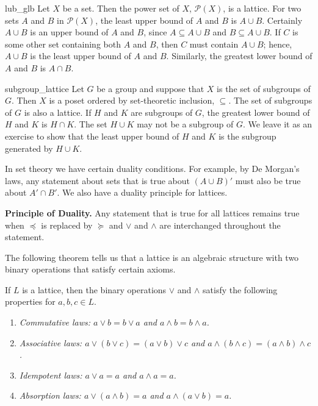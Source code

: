  

\begin{example}{lub_glb}
Let $X$ be a set. Then the power set of $X$, ${\mathcal P}(X)$, is a
lattice. For two sets $A$ and $B$ in ${\mathcal P}(X)$, the least upper
bound of $A$ and $B$ is $A \cup B$. Certainly $A \cup B$ is an upper
bound of $A$ and $B$, since $A \subseteq A \cup B$ and $B \subseteq A
\cup B$.  If $C$ is some other set containing both $A$ and $B$, then
$C$ must contain $A \cup B$; hence, $A \cup B$ is the least upper bound
of $A$ and $B$. Similarly,  the greatest lower bound of $A$ and $B$ is
$A \cap B$.
\end{example}
 
 

\begin{example}{subgroup_lattice}
Let $G$ be a group and suppose that $X$ is the set of subgroups of
$G$.  Then $X$ is a poset ordered by set-theoretic inclusion,
$\subseteq$.  The set of subgroups of $G$ is also a lattice.  If $H$
and $K$ are subgroups of $G$, the greatest lower bound of $H$ and $K$
is $H \cap K$. The set $H \cup K$ may not be a subgroup of $G$.  We
leave it as an exercise to show that the least upper bound of $H$ and
$K$ is the subgroup generated by $H \cup K$. 
\end{example}
 

 
 
In set theory we have certain duality conditions. For example, by De
Morgan's laws, any statement about sets that is true about $(A \cup
B)'$ must also be true about $A' \cap B'$. We also have a duality
principle for lattices. 
 
 
\medskip
 
 
\noindent \textbf{Principle of Duality.}
Any statement that is true for all lattices remains true when
$\preceq$ is replaced by $\succeq$ and $\vee$ and $\wedge$ are
interchanged throughout the statement.
 
 
\medskip
 
 
The following theorem tells us that a lattice is an algebraic
structure with two binary operations that satisfy certain
axioms.						     
 
 
\begin{theorem}
If $L$ is a lattice, then the binary operations $\vee$ and $\wedge$
satisfy the following properties for $a, b, c \in L$.
\begin{enumerate}
 
\rm \item \it
Commutative laws: $a \vee b = b \vee a$ and $a \wedge b = b \wedge a$.
 
\rm \item \it
Associative laws: $a \vee ( b \vee c) = (a \vee b) \vee c$ and $a \wedge (
b \wedge c) = (a \wedge b) \wedge c$. 
 
\rm \item \it
Idempotent laws: $a \vee a = a$ and $a \wedge a = a$.
 
\rm \item \it
Absorption laws: $a \vee (a \wedge b) = a$ and $a \wedge ( a \vee b ) =a$.
 
\end{enumerate}
\end{theorem}
 

